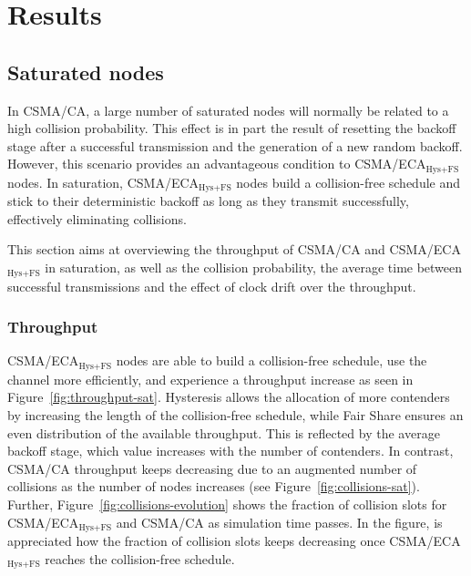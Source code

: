 \section{Results}\label{results}

	\subsection{Saturated nodes}\label{resultsSaturated}
	In CSMA/CA, a large number of saturated nodes will normally be related to a high collision probability. This effect is in part the result of resetting the backoff stage after a successful transmission and the generation of a new random backoff. However, this scenario provides an advantageous condition to CSMA/ECA$_{\text{Hys+FS}}$ nodes. In saturation, CSMA/ECA$_{\text{Hys+FS}}$ nodes build a collision-free schedule and stick to their deterministic backoff as long as they transmit successfully, effectively eliminating collisions.
	
	This section aims at overviewing the throughput of CSMA/CA and CSMA/ECA$_{\text{Hys+FS}}$ in saturation, as well as the collision probability, the average time between successful transmissions and the effect of clock drift over the throughput.
	\\
	\subsubsection{Throughput}
	CSMA/ECA$_{\text{Hys+FS}}$ nodes are able to build a collision-free schedule, use the channel more efficiently, and experience a throughput increase as seen in Figure~\ref{fig:throughput-sat}. Hysteresis allows the allocation of more contenders by increasing the length of the collision-free schedule, while Fair Share ensures an even distribution of the available throughput. This is reflected by the average backoff stage, which value increases with the number of contenders. In contrast, CSMA/CA throughput keeps decreasing due to an augmented number of collisions as the number of nodes increases (see Figure~\ref{fig:collisions-sat}). Further, Figure~\ref{fig:collisions-evolution} shows the fraction of collision slots for CSMA/ECA$_{\text{Hys+FS}}$ and CSMA/CA as simulation time passes. In the figure, is appreciated how the fraction of collision slots keeps decreasing once CSMA/ECA$_{\text{Hys+FS}}$ reaches the collision-free schedule.
	
